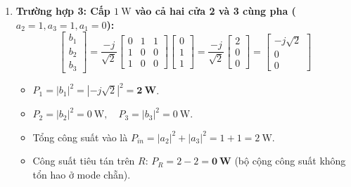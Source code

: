 \documentclass[12pt,a4paper]{article}
\begin{document}
\begin{enumerate}
    \item \textbf{Trường hợp 3: Cấp $1~\text{W}$ vào cả hai cửa 2 và 3 cùng pha ($a_2 = 1, a_3 = 1, a_1 = 0$):}
    \[
    \begin{bmatrix} b_1 \\ b_2 \\ b_3 \end{bmatrix} = \frac{-j}{\sqrt{2}} \begin{bmatrix} 0 & 1 & 1 \\ 1 & 0 & 0 \\ 1 & 0 & 0 \end{bmatrix} \begin{bmatrix} 0 \\ 1 \\ 1 \end{bmatrix} = \frac{-j}{\sqrt{2}} \begin{bmatrix} 2 \\ 0 \\ 0 \end{bmatrix} = \begin{bmatrix} -j\sqrt{2} \\ 0 \\ 0 \end{bmatrix}
    \]
    \begin{itemize}
        \item $P_1 = |b_1|^2 = |-j\sqrt{2}|^2 = \mathbf{2~\text{W}}$.
        \item $P_2 = |b_2|^2 = 0~\text{W}, \quad P_3 = |b_3|^2 = 0~\text{W}$.
        \item Tổng công suất vào là $P_{in} = |a_2|^2 + |a_3|^2 = 1 + 1 = 2~\text{W}$.
        \item Công suất tiêu tán trên $R$: $P_R = 2 - 2 = \mathbf{0~\text{W}}$ (bộ cộng công suất không tổn hao ở mode chẵn).
    \end{itemize}


\end{enumerate}
\end{document}
